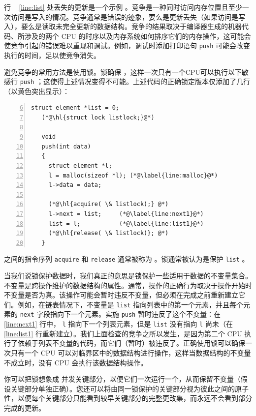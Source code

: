 \documentclass[UTF8]{article}
\begin{document}
行 ~    \ref{line:list}    处丢失的更新是一个示例
        。竞争是一种同时访问内存位置且至少一次访问是写入的情况。竞争通常是错误的迹象，要么是更新丢失（如果访问是写入），要么是读取未完全更新的数据结构。竞争的结果取决于编译器生成的机器代码、所涉及的两个 CPU 的时序以及内存系统如何排序它们的内存操作，这可能会使竞争引起的错误难以重现和调试。例如，调试时添加打印语句
    \lstinline{push}    可能会改变执行的时间，足以使竞争消失。  

避免竞争的常用方法是使用锁。锁确保
        ，这样一次只有一个CPU可以执行以下敏感行
    \lstinline{push}    ；这使得上述情况变得不可能。上述代码的正确锁定版本仅添加了几行（以黄色突出显示）：
    \begin{lstlisting}[numbers=left,firstnumber=6]
   struct element *list = 0;
   (*@\hl{struct lock listlock;}@*)
    	
   void
   push(int data)
   {
     struct element *l;
     l = malloc(sizeof *l); (*@\label{line:malloc}@*)
     l->data = data;
   
     (*@\hl{acquire( \& listlock);} @*)
     l->next = list;     (*@\label{line:next1}@*)
     list = l;           (*@\label{line:list1}@*)
     (*@\hl{release( \& listlock)}; @*)
   }
\end{lstlisting}    之间的指令序列
    \lstinline{acquire}    和
    \lstinline{release}    通常被称为
        。锁通常被认为是保护
    \lstinline{list}    。  

当我们说锁保护数据时，我们真正的意思是锁保护一些适用于数据的不变量集合。不变量是跨操作维护的数据结构的属性。通常，操作的正确行为取决于操作开始时不变量是否为真。该操作可能会暂时违反不变量，但必须在完成之前重新建立它们。例如，在链表情况下，不变量是
    \lstinline{list}    指向列表中的第一个元素，并且每个元素的
    \lstinline{next}    字段指向下一个元素。实施
    \lstinline{push}    暂时违反了这个不变量：在~    \ref{line:next1}    行中，
    \lstinline{l}    指向下一个列表元素，但是
    \lstinline{list}    没有指向
    \lstinline{l}    尚未（在 ~    \ref{line:list1}    行重新建立）。我们上面检查的竞争之所以发生，是因为第二个 CPU 执行了依赖于列表不变量的代码，而它们（暂时）被违反了。正确使用锁可以确保一次只有一个 CPU 可以对临界区中的数据结构进行操作，这样当数据结构的不变量不成立时，没有 CPU 会执行该数据结构操作。  

你可以把锁想象成
        并发关键部分，以便它们一次运行一个，从而保留不变量（假设关键部分单独正确）。您还可以将由同一锁保护的关键部分视为彼此之间的原子性，以便每个关键部分只能看到较早关键部分的完整更改集，而永远不会看到部分完成的更新。  
\end{document}
